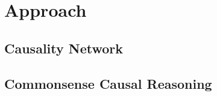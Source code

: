 \section{Approach}
\label{sec:approach}

\subsection{Causality Network}
\label{sec:network}


\subsection{Commonsense Causal Reasoning}
\label{sec:reasoning}

